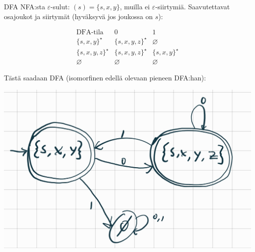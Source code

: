 \documentclass[12pt,a4paper]{article}
\begin{document}
\begin{kohta}

\pagebreak

\item DFA NFA:sta 
$\varepsilon$-sulut: $(s)=\{s,x,y\}$, muilla ei $\varepsilon$-siirtymiä.
Saavutettavat osajoukot ja siirtymät (hyväksyvä jos joukossa on $s$):

\[
\renewcommand{\arraystretch}{1.15}
\begin{array}{c|cc}
\text{DFA-tila} & 0 & 1\\\hline
\{s,x,y\}^\star     & \{s,x,y,z\}^\star & \varnothing \\
\{s,x,y,z\}^\star   & \{s,x,y,z\}^\star & \{s,x,y\}^\star \\
\varnothing         & \varnothing       & \varnothing
\end{array}
\]

\noindent Tästä saadaan DFA (isomorfinen edellä olevaan pieneen DFA:han):

\begin{center}
  \includegraphics[width=.4\textwidth]{viikko4tehtävä2_3.jpg}
\end{center}

\end{kohta}
\end{document}

